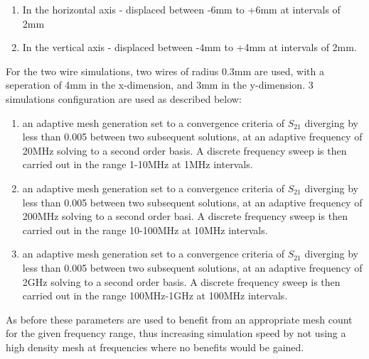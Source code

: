 \begin{enumerate}
\item{In the horizontal axis -  displaced between -6mm to +6mm at intervals of 2mm}
\item{In the vertical axis - displaced between -4mm to +4mm at intervals of 2mm.}
\end{enumerate}

For the two wire simulations, two wires of radius 0.3mm are used, with a seperation of 4mm in the x-dimension, and 3mm in the y-dimension. 3 simulations configuration are used as described below:

\begin{enumerate}
\item{an adaptive mesh generation set to a convergence criteria of $S_{21}$ diverging by less than 0.005 between two subsequent solutions, at an adaptive frequency of 20MHz solving to a second order basis. A discrete frequency sweep is then carried out in the range 1-10MHz at 1MHz intervals.}
\item{an adaptive mesh generation set to a convergence criteria of $S_{21}$ diverging by less than 0.005 between two subsequent solutions, at an adaptive frequency of 200MHz solving to a second order basi. A discrete frequency sweep is then carried out in the range 10-100MHz at 10MHz intervals.}
\item{an adaptive mesh generation set to a convergence criteria of $S_{21}$ diverging by less than 0.005 between two subsequent solutions, at an adaptive frequency of 2GHz solving to a second order basis. A discrete frequency sweep is then carried out in the range 100MHz-1GHz at 100MHz intervals.}
\end{enumerate}

As before these parameters are used to benefit from an appropriate mesh count for the given frequency range, thus increasing simulation speed by not using a high density mesh at frequencies where no benefits would be gained.

